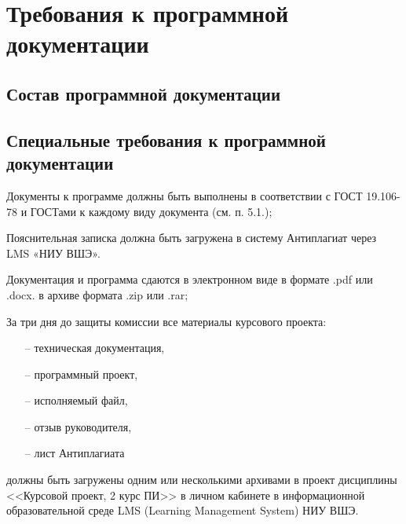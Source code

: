 \section{Требования к программной документации}

\subsection{Состав программной документации}



\subsection{Специальные требования к программной документации}

Документы к программе должны быть выполнены в соответствии с ГОСТ 19.106-78 и ГОСТами к каждому виду документа (см. п. 5.1.);

Пояснительная записка должна быть загружена в систему Антиплагиат через LMS «НИУ ВШЭ».

Документация и программа сдаются в электронном виде в формате .pdf или .docx. в архиве формата .zip или .rar;

За три дня до защиты комиссии все материалы курсового проекта:
\begin{itemize}
    \item[--] техническая документация,
    \item[--] программный проект,
    \item[--] исполняемый файл,
    \item[--] отзыв руководителя,
    \item[--] лист Антиплагиата
\end{itemize}
должны быть загружены одним или несколькими архивами в проект дисциплины <<Курсовой проект, 2 курс ПИ>> в личном кабинете в информационной образовательной среде LMS (Learning Management System) НИУ ВШЭ.
